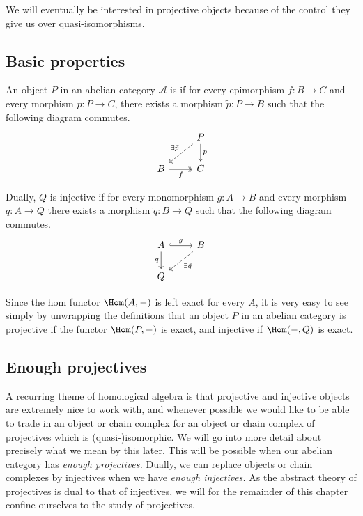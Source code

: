 \documentclass[main.tex]{subfiles}
\begin{document}
We will eventually be interested in projective objects because of the control they give us over quasi-isomorphisms.

\subsection{Basic properties}
\label{ssc:basic_properties}

\begin{definition}
  \label{def:projective_injective}
  An object $P$ in an abelian category $\mathcal{A}$ is  if for every epimorphism $f\colon B \to C$ and every morphism $p\colon P \to C$, there exists a morphism $\tilde{p}\colon P \to B$ such that the following diagram commutes.
  \begin{equation*}
    \begin{tikzcd}
      & P
      \arrow[d, "p"]
      \arrow[dl, dashed, swap, "\exists\tilde{p}"]
      \\
      B
      \arrow[r, twoheadrightarrow, swap, "f"]
      & C
    \end{tikzcd}
  \end{equation*}

  Dually, $Q$ is injective if for every monomorphism $g\colon A \to B$ and every morphism $q\colon A \to Q$ there exists a morphism $\tilde{q}\colon B \to Q$ such that the following diagram commutes.
  \begin{equation*}
    \begin{tikzcd}
      A
      \arrow[r, hookrightarrow, "g"]
      \arrow[d, swap, "q"]
      & B
      \arrow[dl, dashed, "\exists \tilde{q}"]
      \\
      Q
    \end{tikzcd}
  \end{equation*}
\end{definition}

Since the hom functor $\Hom(A, -)$ is left exact for every $A$, it is very easy to see simply by unwrapping the definitions that an object $P$ in an abelian category is projective if the functor $\Hom(P, -)$ is exact, and injective if $\Hom(-, Q)$ is exact.

\subsection{Enough projectives}
\label{ssc:enough_projectives}

A recurring theme of homological algebra is that projective and injective objects are extremely nice to work with, and whenever possible we would like to be able to trade in an object or chain complex for an object or chain complex of projectives which is (quasi-)isomorphic. We will go into more detail about precisely what we mean by this later. This will be possible when our abelian category has \emph{enough projectives.} Dually, we can replace objects or chain complexes by injectives when we have \emph{enough injectives.} As the abstract theory of projectives is dual to that of injectives, we will for the remainder of this chapter confine ourselves to the study of projectives.
\end{document}
